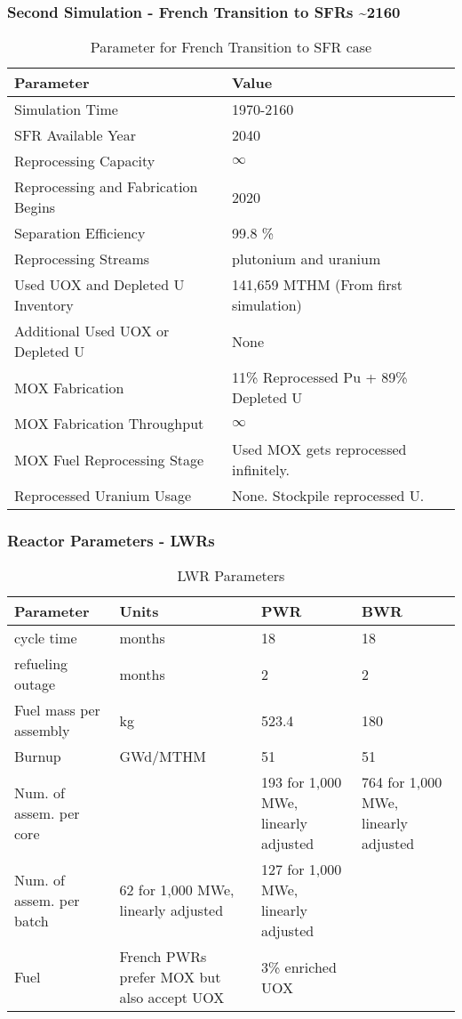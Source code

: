 \begin{frame}
	\frametitle{Second Simulation - French Transition to SFRs \textasciitilde 2160}
	
\begin{table}[h]
	\centering
	\begin{tabularx}{\textwidth}{bb}
		\hline
		Parameter & Value \\
		\hline
		Simulation Time & 1970-2160 \\
		\gls{SFR} Available Year & 2040 \\
		Reprocessing Capacity & $\infty$ \\
		Reprocessing and Fabrication Begins & 2020 \\
		Separation Efficiency & 99.8 \% \\
		Reprocessing Streams & plutonium and uranium \\
		\small{Used \gls{UOX} and Depleted U Inventory} & 141,659 MTHM {\small (From first simulation)} \\
		\small{Additional Used \gls{UOX} or Depleted U} & None  \\
		\gls{MOX} Fabrication &  \small{11\% Reprocessed Pu + 89\% Depleted U}  \\
		\gls{MOX} Fabrication Throughput & $\infty$ \\
		\gls{MOX} Fuel Reprocessing Stage &  Used \gls{MOX} gets reprocessed infinitely. \\
		Reprocessed Uranium Usage &  None. Stockpile reprocessed U. \\
		\hline
	\end{tabularx}
	\caption {Parameter for French Transition to \gls{SFR} case }
	\label{tab:sim_france}
\end{table}

\end{frame}


\begin{frame}
	\frametitle{Reactor Parameters - \glspl{LWR} }
	
	\begin{table}[h]
    \centering
    \begin{tabularx}{\textwidth}{bbbb}
        \hline
        Parameter & Units & PWR & BWR \\
        \hline
        cycle time & months & 18 & 18   \\ 
        refueling outage & months & 2  & 2 \\
        Fuel mass per assembly & kg & 523.4 & 180 \\
        Burnup & GWd/MTHM & 51  & 51   \\
        Num. of assem. per core & & 193 for 1,000 MWe, linearly adjusted & 764 for 1,000 MWe, linearly adjusted \\
        Num. of assem. per batch & 62 for 1,000 MWe, linearly adjusted & 127 for 1,000 MWe, linearly adjusted \\
        Fuel & \small{French \glspl{PWR} prefer \gls{MOX} but also accept \gls{UOX}} & 3\% enriched \gls{UOX}  \\
        \hline
    \end{tabularx}
    \caption {\gls{LWR} Parameters}
    \label{tab:lwr}
    \end{table}
\end{frame}


